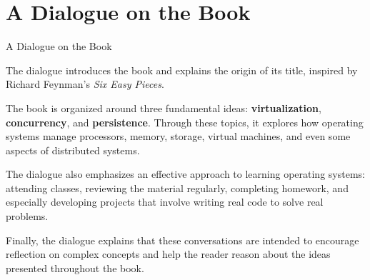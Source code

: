 \section{A Dialogue on the Book}

\begin{frame}{A Dialogue on the Book}

{\small
The dialogue introduces the book and explains the origin of its title, inspired by Richard Feynman's
\textit{Six Easy Pieces}.

\vspace{0.1cm}

The book is organized around three fundamental ideas:
\textbf{virtualization}, \textbf{concurrency}, and \textbf{persistence}.
Through these topics, it explores how operating systems manage processors, memory, storage, virtual machines, and even some aspects of distributed systems.

\vspace{0.1cm}

The dialogue also emphasizes an effective approach to learning operating
systems: attending classes, reviewing the material regularly, completing
homework, and especially developing projects that involve writing real code
to solve real problems.

\vspace{0.1cm}

Finally, the dialogue explains that these conversations are intended to
encourage reflection on complex concepts and help the reader reason about
the ideas presented throughout the book.
}

\end{frame}